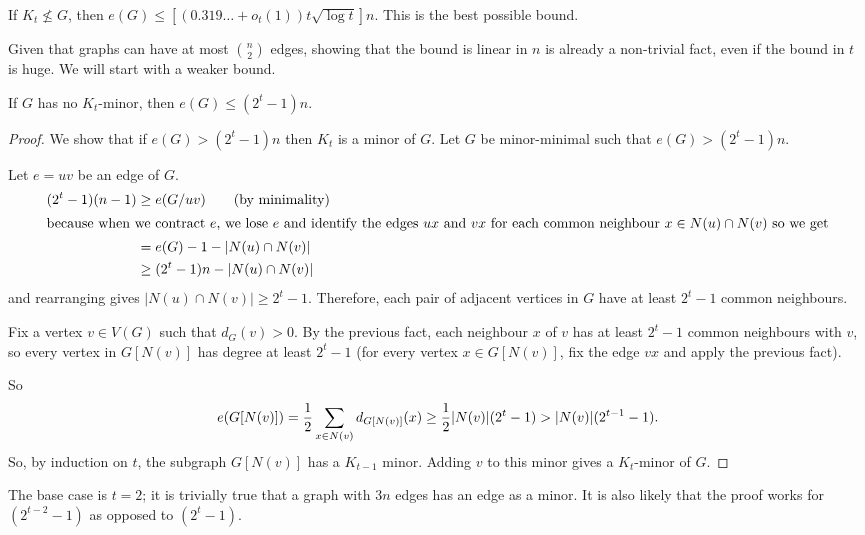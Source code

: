 \documentclass[main.tex]{subfiles}
\begin{document}
\begin{proposition}[Thomason 2001]
  If $K_t\not\leq G$, then $e(G)\leq\left[(0.319\ldots + o_t(1))t\sqrt{\log t}\right]n$.
  This is the best possible bound.
\end{proposition}
Given that graphs can have at most $\binom{n}{2}$ edges, showing that
the bound is linear in $n$ is already a non-trivial fact, even if the bound
in $t$ is huge.
We will start with a weaker bound.
\begin{theorem}[Mader]
  If $G$ has no $K_t$-minor, then $e(G)\leq (2^t-1)n$.
\end{theorem}
\begin{proof}
  We show that if $e(G) > (2^t-1)n$ then $K_t$ is a minor of $G$.
  Let $G$ be minor-minimal such that $e(G) > (2^t-1)n$.

  Let $e = uv$ be an edge of $G$.
  \begin{align*}
    (2^t-1)(n-1)&\geq e(G/uv) \tag{by minimality} \\
    \intertext{because when we contract $e$, we lose $e$ and identify the edges $ux$ and $vx$
    for each common neighbour $x\in N(u)\cap N(v)$ so we get}
                &= e(G) - 1 - |N(u)\cap N(v)| \\
                &\geq (2^t-1)n - |N(u)\cap N(v)|
  \end{align*}
  and rearranging gives $|N(u)\cap N(v)|\geq 2^t-1$.
  Therefore, each pair of adjacent vertices in $G$ have at least $2^t-1$ common
  neighbours.

  Fix a vertex $v\in V(G)$ such that $d_G(v) > 0$.
  By the previous fact, each neighbour $x$ of $v$ has at least $2^t-1$ common
  neighbours with $v$, so every vertex in $G[N(v)]$ has degree at least $2^t-1$
  (for every vertex $x\in G[N(v)]$, fix the edge $vx$ and apply the previous fact).

  So
  \[
    e(G[N(v)]) = \frac{1}{2}\sum_{x\in N(v)}d_{G[N(v)]}(x)\geq\frac{1}{2}|N(v)|(2^t-1)
    > |N(v)|(2^{t-1}-1).
  \]
  So, by induction on $t$, the subgraph $G[N(v)]$ has a $K_{t-1}$ minor.
  Adding $v$ to this minor gives a $K_t$-minor of $G$.
\end{proof}
\begin{remark*}
  The base case is $t=2$; it is trivially true that a graph with $3n$ edges
  has an edge as a minor.
  It is also likely that the proof works for $(2^{t-2}-1)$ as opposed to
  $(2^t-1)$.
\end{remark*}
\end{document}
